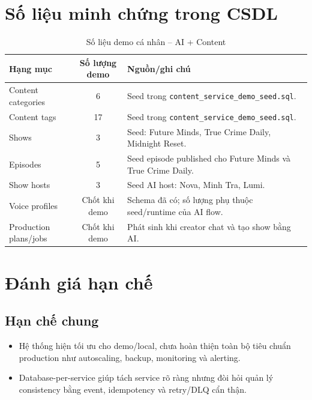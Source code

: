 \documentclass[14pt,a4paper,oneside]{extreport}
\begin{document}
\section{Số liệu minh chứng trong CSDL}
\label{sec:so-lieu-minh-chung}

\begin{table}[H]
\centering
\caption{Số liệu demo cá nhân -- AI + Content}
\label{tab:so-lieu-demo}
\renewcommand{\arraystretch}{1.3}
\small
\begin{tabularx}{\textwidth}{|l|c|X|}
\hline
\textbf{Hạng mục} & \textbf{Số lượng demo} & \textbf{Nguồn/ghi chú} \\
\hline
Content categories & 6 & Seed trong \texttt{content\_service\_demo\_seed.sql}. \\
\hline
Content tags & 17 & Seed trong \texttt{content\_service\_demo\_seed.sql}. \\
\hline
Shows & 3 & Seed: Future Minds, True Crime Daily, Midnight Reset. \\
\hline
Episodes & 5 & Seed episode published cho Future Minds và True Crime Daily. \\
\hline
Show hosts & 3 & Seed AI host: Nova, Minh Tra, Lumi. \\
\hline
Voice profiles & Chốt khi demo & Schema đã có; số lượng phụ thuộc seed/runtime của AI flow. \\
\hline
Production plans/jobs & Chốt khi demo & Phát sinh khi creator chat và tạo show bằng AI. \\
\hline
\end{tabularx}
\end{table}

\section{Đánh giá hạn chế}
\label{sec:han-che}

\subsection{Hạn chế chung}

\begin{itemize}[leftmargin=2cm]
  \item Hệ thống hiện tối ưu cho demo/local, chưa hoàn thiện toàn bộ tiêu chuẩn production như autoscaling, backup, monitoring và alerting.
  \item Database-per-service giúp tách service rõ ràng nhưng đòi hỏi quản lý consistency bằng event, idempotency và retry/DLQ cẩn thận.
\end{itemize}
\end{document}

